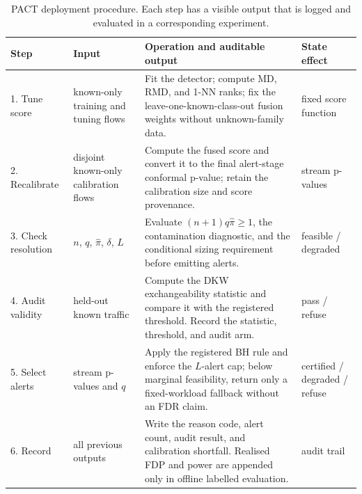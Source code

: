 \documentclass[a4paper,fleqn]{cas-dc}
\begin{document}
\begin{table}[t]
\centering
\caption{PACT deployment procedure. Each step has a visible output that is logged and evaluated in a corresponding experiment.}
\label{tab:pactprocedure}
\scriptsize
\setlength{\tabcolsep}{4pt}
\begin{tabularx}{\textwidth}{L{0.44}L{1.06}L{1.86}L{0.64}}
\toprule
Step & Input & Operation and auditable output & State effect \\
. Tune score & known-only training and tuning flows & Fit the detector; compute MD, RMD, and 1-NN ranks; fix the leave-one-known-class-out fusion weights without unknown-family data. & fixed score function \\
2. Recalibrate & disjoint known-only calibration flows & Compute the fused score and convert it to the final alert-stage conformal p-value; retain the calibration size and score provenance. & stream p-values \\
3. Check resolution & $n$, $q$, $\hat\pi$, $\delta$, $L$ & Evaluate $(n+1)q\hat\pi\geq1$, the contamination diagnostic, and the conditional sizing requirement before emitting alerts. & feasible / degraded \\
4. Audit validity & held-out known traffic & Compute the DKW exchangeability statistic and compare it with the registered threshold. Record the statistic, threshold, and audit arm. & pass / refuse \\
5. Select alerts & stream p-values and $q$ & Apply the registered BH rule and enforce the $L$-alert cap; below marginal feasibility, return only a fixed-workload fallback without an FDR claim. & certified / degraded / refuse \\
6. Record & all previous outputs & Write the reason code, alert count, audit result, and calibration shortfall. Realised FDP and power are appended only in offline labelled evaluation. & audit trail \\
\bottomrule
\end{tabularx}
\end{table}
\end{document}
